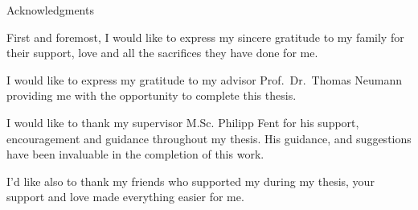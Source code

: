 \thispagestyle{empty}

\vspace*{20mm}

\begin{center}
{ Acknowledgments}
\end{center}

\vspace{10mm}

First and foremost, I would like to express my sincere gratitude to my family for their support, love and all the sacrifices they have done for me.

I would like to express my gratitude to my advisor Prof.\ Dr.\ Thomas Neumann providing me with the opportunity to complete this thesis.

I would like to thank my supervisor M.Sc. Philipp Fent for his support, encouragement and guidance throughout my thesis. His guidance, and suggestions have been invaluable in the completion of this work.

I'd like also to thank my friends who supported my during my thesis, your support and love made everything easier for me.

\cleardoublepage{}
